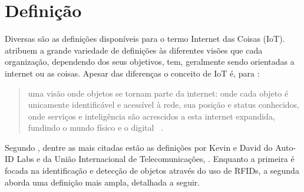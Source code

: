 \documentclass[twoside,english,brazilian]{UNISINOSmonografia}
\begin{document}
\section{Definição}

	Diversas são as definições disponíveis para o termo Internet das 
	Coisas (IoT).  atribuem a grande variedade de 
	definições às diferentes visões que cada organização, dependendo dos 
	seus objetivos, tem, geralmente sendo orientadas a internet ou as 
	coisas. Apesar das diferenças o conceito de IoT é, para 
	:
	
	\begin{quote}
		uma visão onde objetos se tornam parte da internet: onde cada 
		objeto é unicamente identificável e acessível à rede, sua posição 
		e status conhecidos, onde serviços e inteligência são acrescidos a 
		esta internet expandida, fundindo o mundo físico e o digital~
		\cite{Coetzee2011}.
	\end{quote}
	
	Segundo , dentre as mais citadas estão as 
	definições por Kevin  e David 
	 do Auto-ID Labs e da União Internacional de 
	Telecomunicações, . Enquanto a primeira é focada na 
	identificação e detecção de objetos através do uso de RFIDs, a segunda 
	aborda uma definição mais ampla, detalhada a seguir.
	
\end{document}
